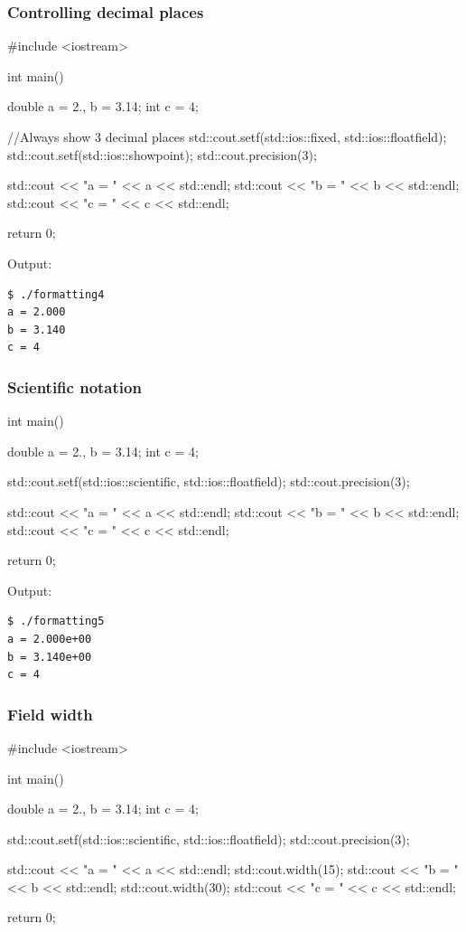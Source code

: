 \documentclass[12pt,letterpaper,twoside]{article}
\begin{document}
\subsubsection{Controlling decimal places}
\begin{cpp}
#include <iostream>

int main() {
  double a = 2., b = 3.14;
  int c = 4;

  //Always show 3 decimal places
  std::cout.setf(std::ios::fixed, std::ios::floatfield);
  std::cout.setf(std::ios::showpoint);
  std::cout.precision(3);

  std::cout << "a = " << a << std::endl;
  std::cout << "b = " << b << std::endl;
  std::cout << "c = " << c << std::endl;

  return 0;
}
\end{cpp}

Output:

\begin{verbatim}
$ ./formatting4
a = 2.000
b = 3.140
c = 4
\end{verbatim}

\subsubsection{Scientific notation}
\begin{cpp}
int main() {
  double a = 2., b = 3.14;
  int c = 4;

  std::cout.setf(std::ios::scientific, std::ios::floatfield);
  std::cout.precision(3);

  std::cout << "a = " << a << std::endl;
  std::cout << "b = " << b << std::endl;
  std::cout << "c = " << c << std::endl;

  return 0;
}
\end{cpp}

Output:

\begin{verbatim}
$ ./formatting5
a = 2.000e+00
b = 3.140e+00
c = 4
\end{verbatim}

\subsubsection{Field width}
\begin{cpp}
#include <iostream>

int main() {
  double a = 2., b = 3.14;
  int c = 4;

  std::cout.setf(std::ios::scientific, std::ios::floatfield);
  std::cout.precision(3);

  std::cout << "a = " << a << std::endl;
  std::cout.width(15);
  std::cout << "b = " << b << std::endl;
  std::cout.width(30);
  std::cout << "c = " << c << std::endl;

  return 0;
}
\end{cpp}
\end{document}
